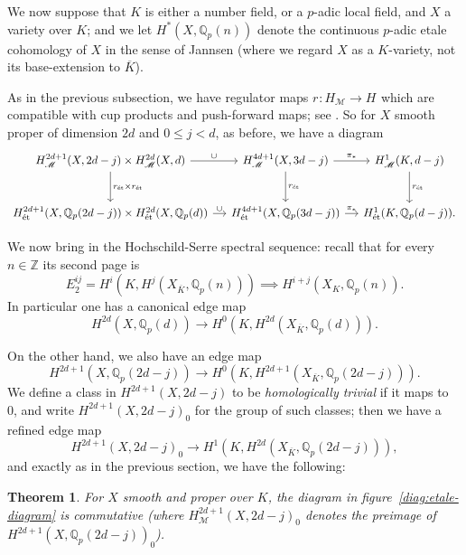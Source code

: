 \documentclass[11pt, a4paper, reqno]{amsart}
\theoremstyle{definition}
\theoremstyle{plain}
\newtheorem{theorem}[definition]{Theorem}
\theoremstyle{remark}
\DeclareMathOperator{\et}{\acute{e}t}
\DeclareMathOperator{\mot}{\mathscr{M}}
\newcommand{\numberset}{\mathbb}
\newcommand{\Q}{\numberset{Q}}
\newcommand{\Z}{\numberset{Z}}
\newcommand{\regulator}[1]{r_{#1}}
\newcommand{\ret}{\regulator{\et}}
\renewcommand{\le}{\leqslant}
\begin{document}
  We now suppose that $K$ is either a number field, or a $p$-adic local field, and $X$ a variety over $K$; and we let $H^*_{\et}(X, \Q_p(n))$ denote the continuous $p$-adic etale cohomology of $X$ in the sense of Jannsen (where we regard $X$ as a $K$-variety, not its base-extension to $\overline{K}$). 
  
  As in the previous subsection, we have regulator maps $\ret \colon H_{\mot} \to H_{\et}$ which are compatible with cup products and push-forward maps; see \cite[Proposition~B.4.6 and Appendix~B]{huberwildeshaus}. So for $X$ smooth proper of dimension $2d$ and $0 \le j < d$, as before, we have a diagram
  \begin{equation}
   \label{diag:etale-compatibility}
   \begin{tikzcd}[column sep=small, row sep=large]
    H^{2d+1}_{\mot}(X,2d-j) \times H^{2d}_{\mot}(X,d) \arrow["\cup"]{r} \arrow["\ret \times \ret"]{d} & H^{4d+1}_{\mot}(X,3d-j) \arrow["\pi_*"]{r} \arrow["\ret"]{d} & H^1_{\mot}(K,d-j) \arrow[d,"\ret"] \\
    H_{\et}^{2d+1}(X,\Q_p(2d-j)) \times H_{\et}^{2d}(X,\Q_p(d)) \arrow["\cup"]{r} & H_{\et}^{4d+1}(X,\Q_p(3d-j)) \arrow["\pi_*"]{r} & H_{\et}^1(K,\Q_p(d-j)).
   \end{tikzcd}
  \end{equation}

  We now bring in the Hochschild-Serre spectral sequence: recall that for every $n\in\Z$ its second page is
  \[
   E_2^{ij} = H^i(K,H^j_{\et}(X_{\overline{K}},\Q_p(n))) \implies H^{i+j}_{\et}(X_K,\Q_p(n)).
  \]
  In particular one has a canonical edge map
  \[
   H_{\et}^{2d}(X,\Q_p(d)) \to H^0(K, H^{2d}_{\et}(X_{\overline{K}},\Q_p(d))).
  \]

  On the other hand, we also have an edge map
  \[ H^{2d+1}_{\et}(X,\Q_p(2d-j)) \to H^0(K,H^{2d+1}_{\et}(X_{\overline{K}}, \Q_p(2d-j))).\]
  We define a class in $H^{2d+1}_{\et}(X, 2d-j)$ to be \emph{homologically trivial} if it maps to 0, and write $H^{2d+1}_{\et}(X, 2d-j)_0$ for the group of such classes; then we have a refined edge map
  \[ H^{2d+1}_{\et}(X, 2d-j)_0 \to H^1(K,H^{2d}_{\et}(X_{\overline{K}},\Q_p(2d-j))), \]
  and exactly as in the previous section, we have the following:

  \begin{theorem}
   For $X$ smooth and proper over $K$, the diagram in figure~\ref{diag:etale-diagram} is commutative (where $ H^{2d+1}_{\mot}(X,2d-j)_0$ denotes the preimage of $H_{\et}^{2d+1}(X, \Q_p(2d-j))_0$).
  \end{theorem}
\end{document}
